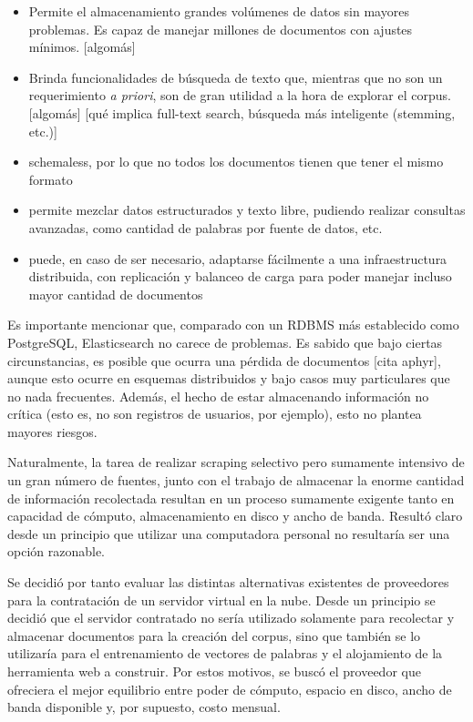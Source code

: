 \begin{itemize}

\item Permite el almacenamiento grandes volúmenes de datos sin mayores problemas. Es capaz de
manejar millones de documentos con ajustes mínimos. [algomás]

\item Brinda funcionalidades de búsqueda de texto que, mientras que no son un requerimiento
\textit{a priori}, son de gran utilidad a la hora de explorar el corpus. [algomás] [qué implica
full-text search, búsqueda más inteligente (stemming, etc.)]

\item schemaless, por lo que no todos los documentos tienen que tener el mismo formato

\item permite mezclar datos estructurados y texto libre, pudiendo realizar consultas avanzadas, como
cantidad de palabras por fuente de datos, etc.

\item puede, en caso de ser necesario, adaptarse fácilmente a una infraestructura distribuida, con
replicación y balanceo de carga para poder manejar incluso mayor cantidad de documentos

\end{itemize}

Es importante mencionar que, comparado con un RDBMS más establecido como PostgreSQL, Elasticsearch
no carece de problemas. Es sabido que bajo ciertas circunstancias, es posible que ocurra una pérdida
de documentos [cita aphyr], aunque esto ocurre en esquemas distribuidos y bajo casos muy
particulares que no nada frecuentes. Además, el hecho de estar almacenando información no crítica
(esto es, no son registros de usuarios, por ejemplo), esto no plantea mayores riesgos.

Naturalmente, la tarea de realizar scraping selectivo pero sumamente intensivo de un gran número de
fuentes, junto con el trabajo de almacenar la enorme cantidad de información recolectada resultan en un
proceso sumamente exigente tanto en capacidad de cómputo, almacenamiento en disco y ancho de
banda. Resultó claro desde un principio que utilizar una computadora personal no resultaría ser una
opción razonable.

Se decidió por tanto evaluar las distintas alternativas existentes de proveedores para la contratación de
un servidor virtual en la nube. Desde un principio se decidió que el servidor contratado no sería
utilizado solamente para recolectar y almacenar documentos para la creación del corpus, sino que también
se lo utilizaría para el entrenamiento de vectores de palabras y el alojamiento de la herramienta web a
construir. Por estos motivos, se buscó el proveedor que ofreciera el mejor equilibrio entre poder de
cómputo, espacio en disco, ancho de banda disponible y, por supuesto, costo mensual.

